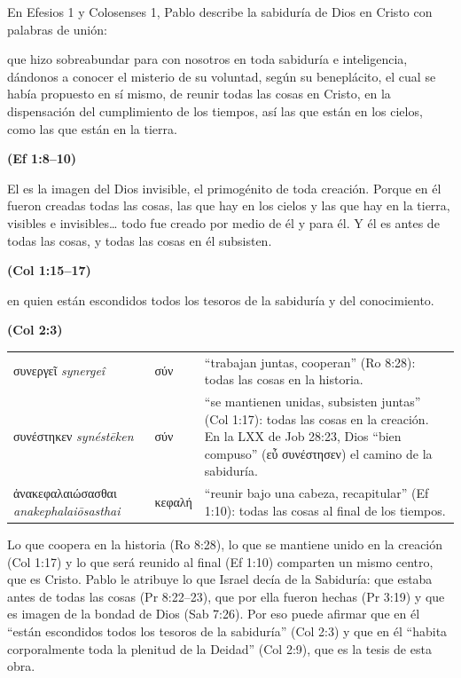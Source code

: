\documentclass[11pt,letterpaper]{article}
\newcommand{\grc}[1]{\foreignlanguage{ancientgreek}{#1}}
\newcommand{\fuente}[1]{\par\hfill{\upshape\bfseries\small\textcolor{azul}{#1}}}
\begin{document}
En Efesios 1 y Colosenses 1, Pablo describe la sabiduría de Dios en Cristo con palabras de unión:

\begin{cita}que hizo sobreabundar para con nosotros en toda sabiduría e inteligencia, dándonos a conocer el misterio de su voluntad, según su beneplácito, el cual se había propuesto en sí mismo, de reunir todas las cosas en Cristo, en la dispensación del cumplimiento de los tiempos, así las que están en los cielos, como las que están en la tierra.\fuente{(Ef 1:8--10)}\end{cita}

\begin{cita}El es la imagen del Dios invisible, el primogénito de toda creación. Porque en él fueron creadas todas las cosas, las que hay en los cielos y las que hay en la tierra, visibles e invisibles\ldots{} todo fue creado por medio de él y para él. Y él es antes de todas las cosas, y todas las cosas en él subsisten.\fuente{(Col 1:15--17)}\end{cita}

\begin{cita}en quien están escondidos todos los tesoros de la sabiduría y del conocimiento.\fuente{(Col 2:3)}\end{cita}

\begin{filologia}[Ro 8:28, Col 1:17 y Ef 1:10]
\begin{tabular}{@{}L{3.2cm}L{1.6cm}L{10cm}@{}}
\grc{συνεργεῖ} \emph{synergeî} & \grc{σύν} & ``trabajan juntas, cooperan'' (Ro 8:28): todas las cosas en la historia. \\[2pt]
\grc{συνέστηκεν} \emph{synéstēken} & \grc{σύν} & ``se mantienen unidas, subsisten juntas'' (Col 1:17): todas las cosas en la creación. En la LXX de Job 28:23, Dios ``bien compuso'' (\grc{εὖ συνέστησεν}) el camino de la sabiduría. \\[2pt]
\grc{ἀνακεφαλαιώσασθαι} \emph{anakephalaiōsasthai} & \grc{κεφαλή} & ``reunir bajo una cabeza, recapitular'' (Ef 1:10): todas las cosas al final de los tiempos. \\
\end{tabular}
\end{filologia}

Lo que coopera en la historia (Ro 8:28), lo que se mantiene unido en la creación (Col 1:17) y lo que será reunido al final (Ef 1:10) comparten un mismo centro, que es Cristo. Pablo le atribuye lo que Israel decía de la Sabiduría: que estaba antes de todas las cosas (Pr 8:22--23), que por ella fueron hechas (Pr 3:19) y que es imagen de la bondad de Dios (Sab 7:26). Por eso puede afirmar que en él ``están escondidos todos los tesoros de la sabiduría'' (Col 2:3) y que en él ``habita corporalmente toda la plenitud de la Deidad'' (Col 2:9), que es la tesis de esta obra.
\end{document}
